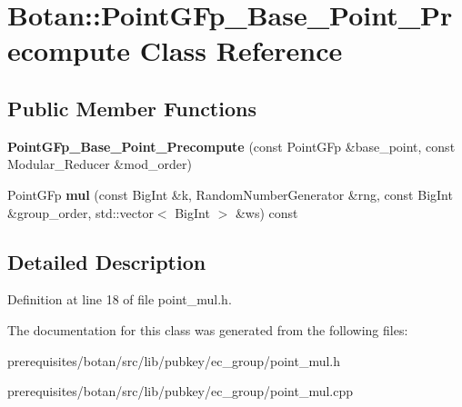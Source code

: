 \hypertarget{class_botan_1_1_point_g_fp___base___point___precompute}{}\section{Botan\+:\+:Point\+G\+Fp\+\_\+\+Base\+\_\+\+Point\+\_\+\+Precompute Class Reference}
\label{class_botan_1_1_point_g_fp___base___point___precompute}
\subsection*{Public Member Functions}
\begin{DoxyCompactItemize}
\item 
\mbox{\label{class_botan_1_1_point_g_fp___base___point___precompute_a67f55bf52eb16a4af8859f848c0cc6fa}} 
{\bfseries Point\+G\+Fp\+\_\+\+Base\+\_\+\+Point\+\_\+\+Precompute} (const Point\+G\+Fp \&base\+\_\+point, const Modular\+\_\+\+Reducer \&mod\+\_\+order)
\item 
\mbox{\label{class_botan_1_1_point_g_fp___base___point___precompute_a5e2d25699c4905eed98a0f29a30f02b6}} 
Point\+G\+Fp {\bfseries mul} (const Big\+Int \&k, Random\+Number\+Generator \&rng, const Big\+Int \&group\+\_\+order, std\+::vector$<$ Big\+Int $>$ \&ws) const
\end{DoxyCompactItemize}


\subsection{Detailed Description}


Definition at line 18 of file point\+\_\+mul.\+h.



The documentation for this class was generated from the following files\+:\begin{DoxyCompactItemize}
\item 
prerequisites/botan/src/lib/pubkey/ec\+\_\+group/point\+\_\+mul.\+h\item 
prerequisites/botan/src/lib/pubkey/ec\+\_\+group/point\+\_\+mul.\+cpp\end{DoxyCompactItemize}
